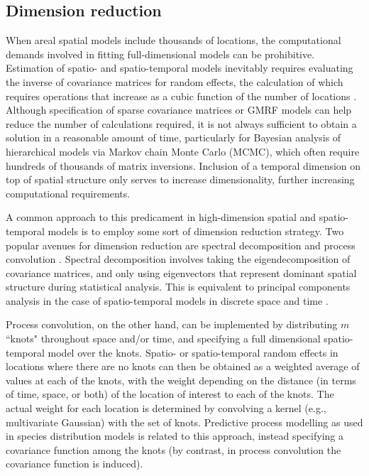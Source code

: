 \documentclass[times,mee,doublespace,]{besauth2}
\begin{document}
\subsection{Dimension reduction}

When areal spatial models include thousands of locations, the computational demands involved in fitting full-dimensional models can be prohibitive.  Estimation of spatio- and spatio-temporal models inevitably requires
evaluating the inverse of covariance matrices for random effects, the calculation of which requires operations that increase as a cubic function of the number of locations \citep{Wikle2010}.  Although specification of sparse covariance matrices or GMRF models can help reduce the number of calculations required, it is not always sufficient to obtain a solution in a reasonable amount of time, particularly for Bayesian analysis of
hierarchical models via Markov chain Monte Carlo (MCMC), which often require hundreds of thousands of matrix inversions.  Inclusion of a temporal dimension on top of spatial structure only serves to increase dimensionality, further increasing computational requirements.

A common approach to this predicament in high-dimension spatial and spatio-temporal models is to employ some sort of dimension reduction strategy. Two popular avenues for dimension reduction are spectral decomposition \citep[also called empirical orthogonal function analysis in geostatistical parlance;][]{Preisendorfer1988} and process convolution \citep[e.g.][]{Higdon1998}. Spectral decomposition involves taking the eigendecomposition of covariance matrices, and only using eigenvectors that represent dominant spatial structure during statistical analysis.  This is equivalent to principal components analysis in the case of spatio-temporal models in discrete space and time \citep{CressieWikle2011}.

Process convolution, on the other hand, can be implemented by distributing $m$ ``knots" throughout space and/or time, and specifying a full dimensional spatio-temporal model over the knots.  Spatio- or spatio-temporal random effects in locations where there are no knots can then be obtained as a weighted average of values at each of the knots, with the weight depending on the distance (in terms of time, space, or both) of the location of interest to each of the knots.  The actual weight for each location is determined by convolving a kernel (e.g., multivariate Gaussian) with the set of knots.  Predictive process modelling \citep{BanerjeeEtAl2008} as used in species distribution models \citep[e.g.][]{LatimerEtAl2009} is related to this approach, instead specifying a covariance function among the knots (by contrast, in process convolution the covariance function is induced).
\end{document}
